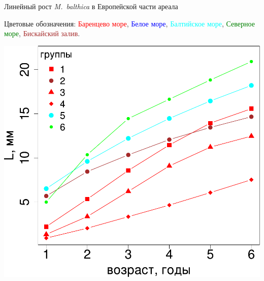 \documentclass{beamer}
\begin{document}
\begin{frame}{Линейный рост {\it M.~balthica} в Европейской части ареала}
\begin{minipage}[t]{.52\linewidth}
Цветовые обозначения: \textcolor{red}{Баренцево море}, 
\textcolor{blue}{Белое море}, 
\textcolor{cyan}{Балтийское море}, 
\textcolor{green}{Северное море}, 
\textcolor{brown}{Бискайский залив}.
	\end{minipage}
%
	\begin{minipage}[t]{.45\linewidth}
		\begin{center}
			\includegraphics[width=\textwidth]{./Europe_growth_groups_big1.pdf}
		\end{center}
	\end{minipage}
\end{frame}
\end{document}
